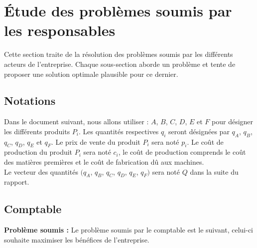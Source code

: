 \documentclass[paper=a4, fontsize=11pt]{scrartcl}
\numberwithin{equation}{section}		%
\numberwithin{figure}{section}			%
\numberwithin{table}{section}				%
\renewcommand{\bf}[1]{\textbf{#1}}
\begin{document}


\tableofcontents
\listoftodos

\newpage

\section{\'Etude des problèmes soumis par les responsables}
Cette section traite de la résolution des problèmes soumis par les différents acteurs de l'entreprise. Chaque sous-section aborde un problème et tente de proposer une solution optimale plausible pour ce dernier.


\begin{shaded}
\vspace{-0.5cm}

\subsection*{Notations}
Dans le document suivant, nous allons utiliser : 
$A$, $B$, $C$, $D$, $E$ et $F$ pour désigner les différents produits $P_i$. Les quantités respectives $q_i$ seront désignées par $q_A$, $q_B$, $q_C$, $q_D$, $q_E$ et $q_F$. Le prix de vente du produit $P_i$ sera noté $p_i$. Le coût de production du produit $P_i$ sera noté $c_i$, le coût de production comprends le coût des matières premières et le coût de fabrication dû aux machines.\\

Le vecteur des quantités $(q_A$, $q_B$, $q_C$, $q_D$, $q_E$, $q_F)$ sera noté $Q$ dans la suite du rapport.

\end{shaded}
\subsection{Comptable}
\bf{Problème soumis :}
Le problème soumis par le comptable est le suivant, celui-ci souhaite maximiser les bénéfices de l'entreprise.\\
\end{document}
